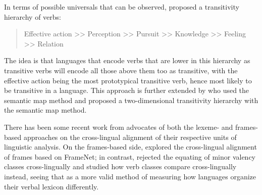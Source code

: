 In terms of possible universals that can be observed, \citet{tsunoda1981, tsunoda1985} proposed a transitivity hierarchy of verbs:
\begin{quote}
    Effective action >> Perception >> Pursuit >> Knowledge >> Feeling >> Relation
\end{quote}
The idea is that languages that encode verbs that are lower in this hierarchy as transitive verbs will encode all those above them too as transitive, with the effective action being the most prototypical transitive verb, hence most likely to be transitive in a language. This approach is further extended by \citet{malchukov2005} who used the semantic map method and proposed a two-dimensional transitivity hierarchy with the semantic map method. 

There has been some recent work from advocates of both the lexeme- and frames-based approaches on the cross-lingual alignment of their respective units of linguistic analysis. On the frames-based side, \citet{baker2020, ellsworth2021} explored the cross-lingual alignment of frames based on FrameNet; in contrast, \citet{say2014} rejected the equating of minor valency classes cross-lingually and studied how verb classes compare cross-lingually instead, seeing that as a more valid method of measuring how languages organize their verbal lexicon differently.
